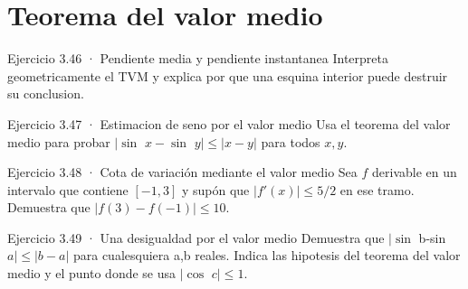 \documentclass[10pt,a4paper,oneside,openany]{book}
\begin{document}
\section{Teorema del valor medio}
\begin{PSevenExerciseFixed}{Ejercicio 3.46 · Pendiente media y pendiente instantanea}
Interpreta geometricamente el TVM y explica por que una esquina interior puede destruir su conclusion.
\end{PSevenExerciseFixed}
\begin{PSevenExerciseFixed}{Ejercicio 3.47 · Estimacion de seno por el valor medio}
Usa el teorema del valor medio para probar \(|\sin\) \(x-\sin\) \(y|\le |x-y|\) para todos \(x,y\).
\end{PSevenExerciseFixed}
\begin{PSevenExerciseFixed}{Ejercicio 3.48 · Cota de variación mediante el valor medio}
Sea \(f\) derivable en un intervalo que contiene \([-1,3]\) y supón que \(|f'(x)|\le5/2\) en ese tramo. Demuestra que \(|f(3)-f(-1)|\le10\).
\end{PSevenExerciseFixed}
\begin{PSevenExerciseFixed}{Ejercicio 3.49 · Una desigualdad por el valor medio}
Demuestra que \(|\sin\) b-sin \(a|\le |b-a|\) para cualesquiera a,b reales. Indica las hipotesis del teorema del valor medio y el punto donde se usa \(|\cos\) \(c|\le 1\).
\end{PSevenExerciseFixed}
\end{document}

